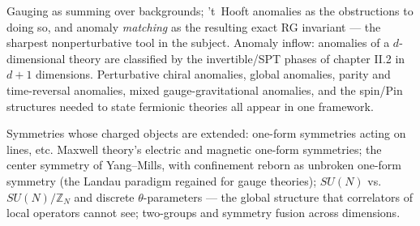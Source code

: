 Gauging as summing over backgrounds; 't~Hooft anomalies as the obstructions to doing so, and anomaly \emph{matching} as the resulting exact RG invariant --- the sharpest nonperturbative tool in the subject. Anomaly inflow: anomalies of a $d$-dimensional theory are classified by the invertible/SPT phases of chapter II.2 in $d+1$ dimensions. Perturbative chiral anomalies, global anomalies, parity and time-reversal anomalies, mixed gauge-gravitational anomalies, and the spin/Pin structures needed to state fermionic theories all appear in one framework.

Symmetries whose charged objects are extended: one-form symmetries acting on lines, etc. Maxwell theory's electric and magnetic one-form symmetries; the center symmetry of Yang--Mills, with confinement reborn as unbroken one-form symmetry (the Landau paradigm regained for gauge theories); $SU(N)$ vs.\ $SU(N)/\mathbb{Z}_N$ and discrete $\theta$-parameters --- the global structure that correlators of local operators cannot see; two-groups and symmetry fusion across dimensions.

